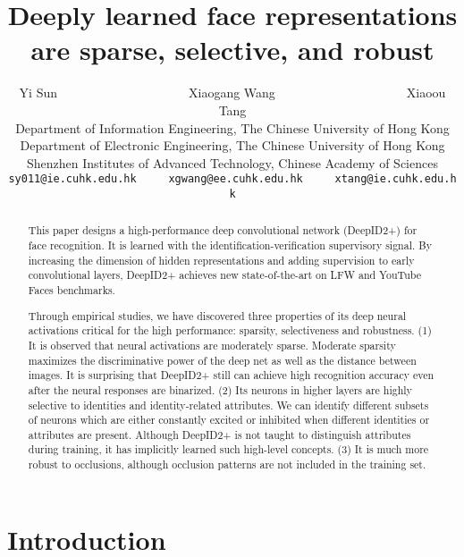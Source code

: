 \documentclass[10pt,twocolumn,letterpaper]{article}
\begin{document}
\title{Deeply learned face representations are sparse, selective, and robust}

\author{Yi Sun~~~~~~~~~~~~~~~~~~~~~Xiaogang Wang~~~~~~~~~~~~~~~~~~~~~Xiaoou Tang\\
{\small Department of Information Engineering, The Chinese University of Hong Kong}\\
{\small Department of Electronic Engineering, The Chinese University of Hong Kong}\\
{\small Shenzhen Institutes of Advanced Technology, Chinese Academy of Sciences}\\
{\tt\small sy011@ie.cuhk.edu.hk~~~~~xgwang@ee.cuhk.edu.hk~~~~~xtang@ie.cuhk.edu.hk}}

\maketitle

\begin{abstract}
   This paper designs a high-performance deep convolutional network (DeepID2+) for face recognition. It is learned with the identification-verification supervisory signal. By increasing the dimension of hidden representations and adding  supervision to early convolutional layers, DeepID2+ achieves new state-of-the-art on LFW  and YouTube Faces benchmarks.

    Through empirical studies, we have discovered three properties of its deep neural activations critical for the high performance: sparsity, selectiveness and robustness.  (1) It is observed that neural activations are moderately sparse. Moderate sparsity maximizes the discriminative power of the deep net as well as the distance between images. It is surprising that DeepID2+ still can achieve high recognition accuracy even after the neural responses are binarized. (2) Its neurons in higher layers are highly selective to identities and identity-related attributes. We can identify different subsets of neurons which are either constantly excited or inhibited when different identities or attributes are present.  Although  DeepID2+  is not taught to distinguish attributes during training, it has implicitly learned such high-level concepts. (3) It is much more robust to occlusions, although occlusion patterns are not included in the training set.
\end{abstract}


\section{Introduction}
\end{document}
